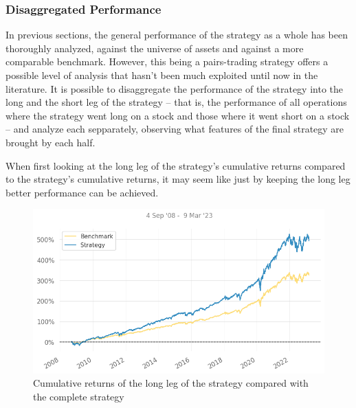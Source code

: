 \subsubsection{Disaggregated Performance}
In previous sections, the general performance of the strategy as a whole has been thoroughly analyzed, against the universe of assets and against a more comparable benchmark. However, this being a pairs-trading strategy offers a possible level of analysis that hasn't been much exploited until now in the literature. It is possible to disaggregate the performance of the strategy into the long and the short leg of the strategy -- that is, the performance of all operations where the strategy went long on a stock and those where it went short on a stock -- and analyze each sepparately, observing what features of the final strategy are brought by each half. 

When first looking at the long leg of the strategy's cumulative returns compared to the strategy's cumulative returns, it may seem like just by keeping the long leg better performance can be achieved.

\begin{figure}[ht]
    \captionsetup{justification=centering}
    \includegraphics[width=\linewidth]{assets/long-vs-strat.png}
    \caption{Cumulative returns of the long leg of the strategy compared with the complete strategy}
    \label{fig:long-vs-strat}
\end{figure}

